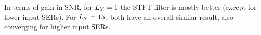 In terms of gain in SNR, for $\Ly = 1$ the STFT filter is mostly better (except for lower input SERs). For $\Ly = 15$, both have an overall similar result, also converging for higher input SERs.

%
%		
%		
%		
%
%
